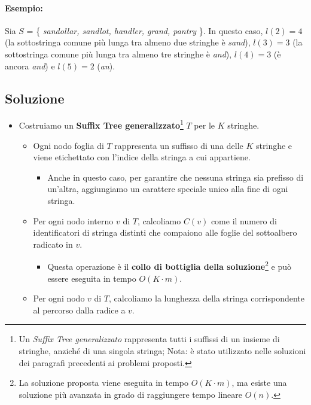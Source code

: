 \paragraph{Esempio:} Sia $S$ = \{ \emph{sandollar, sandlot, handler, grand, pantry} \}. In questo caso, $l(2) = 4$ (la sottostringa comune più lunga tra almeno due stringhe è \emph{sand}), $l(3) = 3$ (la sottostringa comune più lunga tra almeno tre stringhe è \emph{and}), $l(4) = 3$ (è ancora \emph{and}) e $l(5) = 2$ (\emph{an}).


\subsection*{Soluzione}
\begin{itemize}
    \item Costruiamo un \textbf{Suffix Tree generalizzato}\footnote{
        Un \emph{Suffix Tree generalizzato} rappresenta tutti i suffissi di un insieme di stringhe, anziché di una singola stringa; Nota: è stato utilizzato nelle soluzioni dei paragrafi precedenti ai problemi proposti.
        } $T$ per le $K$ stringhe.
    \begin{itemize}
        \item Ogni nodo foglia di $T$ rappresenta un suffisso di una delle $K$ stringhe e viene etichettato con l'indice della stringa a cui appartiene.
        \begin{itemize}
            \item Anche in questo caso, per garantire che nessuna stringa sia prefisso di un'altra, aggiungiamo un carattere speciale unico alla fine di ogni stringa.
        \end{itemize}
        \item Per ogni nodo interno $v$ di $T$, calcoliamo $C(v)$ come il numero di identificatori di stringa distinti che compaiono alle foglie del sottoalbero radicato in $v$.
        \begin{itemize}
            \item Questa operazione è il \textbf{collo di bottiglia della soluzione}\footnote{
            La soluzione proposta viene eseguita in tempo $O(K \cdot m)$, ma esiste una soluzione più avanzata in grado di raggiungere tempo lineare $O(n)$.
        } e può essere eseguita in tempo $O(K \cdot m)$.
        \end{itemize}
        \item Per ogni nodo $v$ di $T$, calcoliamo la lunghezza della stringa corrispondente al percorso dalla radice a $v$.
    \end{itemize}


\end{itemize}

